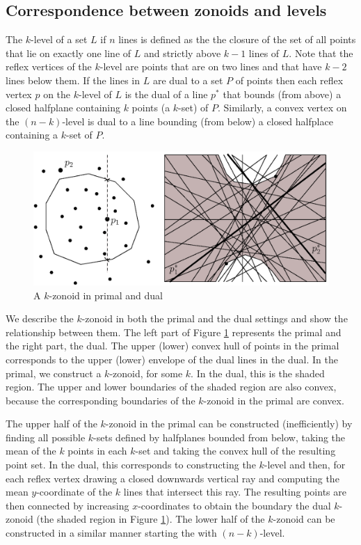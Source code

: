 \documentclass{elsart}
\begin{document}
\subsection{Correspondence between zonoids and levels}\label{subsection_correspondence_between_zonoids_and_klevel}

The $k$-level of a set $L$ if $n$ lines is defined as the the closure
of the set of all points that lie on exactly one line of $L$ and
strictly above $k-1$ lines of $L$.  Note that the reflex vertices of
the $k$-level are points that are on two lines and that have $k-2$
lines below them.  If the lines in $L$ are dual to a set $P$ of points
then each reflex vertex $p$ on the $k$-level of $L$ is the dual of a
line $p^*$ that bounds (from above) a closed halfplane containing $k$
points (a $k$-set) of $P$. Similarly, a convex vertex on the
$(n-k)$-level is dual to a line bounding (from below) a closed
halfplace containing a $k$-set of $P$.

\begin{figure}
 \begin{center} 
   \includegraphics[height=2in]{fig4}
   \caption{A $k$-zonoid in primal and dual}
   \label{fig_primal_dual}
 \end{center}
\end{figure}

We describe the $k$-zonoid in both the primal and the dual settings
and show the relationship between them. The left part of Figure
\ref{fig_primal_dual} represents the primal and the right part, the
dual. The upper (lower) convex hull of points in the primal
corresponds to the upper (lower) envelope of the dual lines in the
dual. In the primal, we construct a $k$-zonoid, for some $k$. In the
dual, this is the shaded region. The upper and lower boundaries of the
shaded region are also convex, because the corresponding boundaries of
the $k$-zonoid in the primal are convex. 

The upper half of the $k$-zonoid in the primal can be constructed
(inefficiently) by finding all possible $k$-sets defined by halfplanes
bounded from below, taking the mean of the $k$ points in each $k$-set
and taking the convex hull of the resulting point set. In the dual,
this corresponds to constructing the $k$-level and then, for each
reflex vertex drawing a closed downwards vertical ray and computing
the mean $y$-coordinate of the $k$ lines that intersect this ray.  The
resulting points are then connected by increasing $x$-coordinates to
obtain the boundary the dual $k$-zonoid (the shaded region in Figure
\ref{fig_primal_dual}).   The lower half of the $k$-zonoid can be
constructed in a similar manner starting the with $(n-k)$-level.
\end{document}
